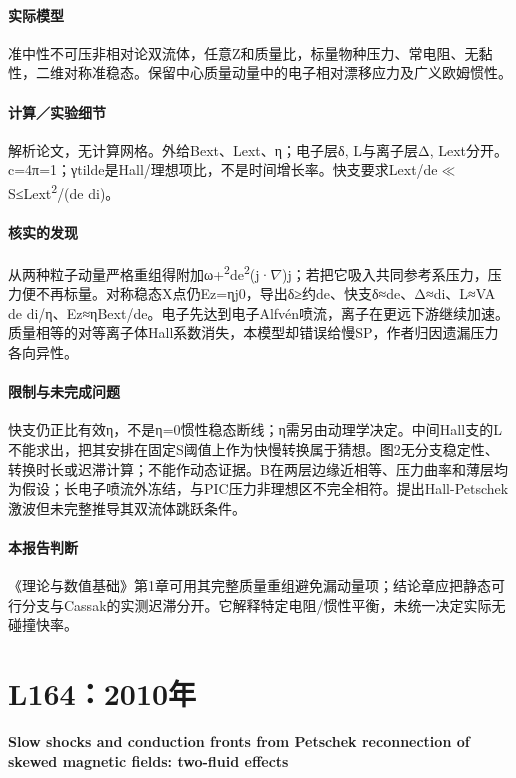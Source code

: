 \documentclass[UTF8,a4paper,11pt,openany,fontset=fandol]{ctexbook}
\begin{document}
\paragraph{实际模型}准中性不可压非相对论双流体，任意Z和质量比，标量物种压力、常电阻、无黏性，二维对称准稳态。保留中心质量动量中的电子相对漂移应力及广义欧姆惯性。

\paragraph{计算／实验细节}解析论文，无计算网格。外给Bext、Lext、η；电子层δ, L与离子层Δ, Lext分开。c=4π=1；γtilde是Hall/理想项比，不是时间增长率。快支要求Lext/de\ensuremath{\ll}S≤Lext\textsuperscript{2}/(de di)。

\paragraph{核实的发现}从两种粒子动量严格重组得附加ω+\textsuperscript{2}de\textsuperscript{2}(j·\ensuremath{\nabla})j；若把它吸入共同参考系压力，压力便不再标量。对称稳态X点仍Ez=ηj0，导出δ≥约de、快支δ≈de、Δ≈di、L≈VA de di/η、Ez≈ηBext/de。电子先达到电子Alfvén喷流，离子在更远下游继续加速。质量相等的对等离子体Hall系数消失，本模型却错误给慢SP，作者归因遗漏压力各向异性。

\paragraph{限制与未完成问题}快支仍正比有效η，不是η=0惯性稳态断线；η需另由动理学决定。中间Hall支的L不能求出，把其安排在固定S阈值上作为快慢转换属于猜想。图2无分支稳定性、转换时长或迟滞计算；不能作动态证据。B在两层边缘近相等、压力曲率和薄层均为假设；长电子喷流外冻结，与PIC压力非理想区不完全相符。提出Hall-Petschek激波但未完整推导其双流体跳跃条件。

\paragraph{本报告判断}《理论与数值基础》第1章可用其完整质量重组避免漏动量项；结论章应把静态可行分支与Cassak的实测迟滞分开。它解释特定电阻/惯性平衡，未统一决定实际无碰撞快率。

\section{L164：2010年}\label{paper:L164}

\textbf{Slow shocks and conduction fronts from Petschek reconnection of skewed magnetic fields: two-fluid effects}\citep{L164}\
\end{document}
